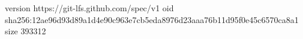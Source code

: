 version https://git-lfs.github.com/spec/v1
oid sha256:12ae96d93d89a1d4e90c963e7cb5eda8976d23aaa76b11d95f0e45c6570ca8a1
size 393312
